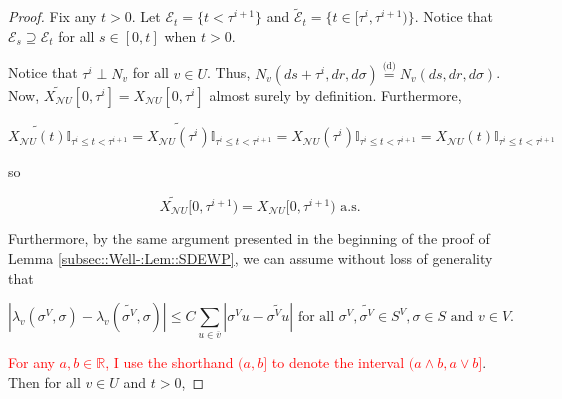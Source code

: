 \documentclass[12pt]{article}
\newcommand{\mb}{\mathbb}
\newcommand{\mc}{\mathcal}
\newcommand{\ov}{\overline}
\newcommand{\te}{\text}
\newcommand{\tr}{\textcolor{red}}
\newcommand{\ind}{\hspace{24pt}}
\newcommand{\deq}{\overset{\text{(d)}}{=}}			%
\newcommand{\neigh}{\mc{N}}					%
\renewcommand{\v}{v}							%
\newcommand{\vv}{u}								%
\renewcommand{\U}{U}							%
\newcommand{\cl}{\ov}							%
\renewcommand{\S}{S}							%
\newcommand{\s}{\sigma}							%
\newcommand{\sv}[1]{\s^{#1}}					%
\renewcommand{\t}{t}							%
\newcommand{\poiss}[1]{N_{#1}}						%
\newcommand{\V}{V}									%
\renewcommand{\tt}{s}								%
\newcommand{\rt}[1]{\tau^{#1}}						%
\newcommand{\itt}{i}								%
\newcommand{\XState}[1]{\S^{#1}}				%
\newcommand{\rxvt}[2]{X_{#1}{(#2)}}					%
\newcommand{\rxvts}[2]{X_{#1}{#2}}					%
\newcommand{\rate}[1]{\lambda_{#1}}					%
\newcommand{\const}[1]{C_{#1}}						%
\newcommand{\alt}{\widetilde}						%
\newcommand{\evnt}{\mc{E}}						%
\begin{document}
\begin{proof}
\ind Fix any \(\t > 0\). Let \(\evnt_\t = \{\t < \rt{\itt+1}\}\) and \(\alt{\evnt}_\t = \{\t\in [\rt{\itt},\rt{\itt+1})\}\). Notice that \(\evnt_\tt \supseteq \evnt_\t\) for all \(\tt\in [0,\t]\) when \(\t > 0\). 

\ind Notice that \(\rt{\itt} \perp \poiss{\v}\) for all \(\v \in \U\). Thus, \(\poiss{\v}(d\tt+\rt{\itt},dr,d\s) \deq \poiss{\v}(d\tt,dr,d\s)\). Now, \(\alt{\rxvts{\neigh{\U}}{}}[0,\rt{\itt}] = \rxvts{\neigh{\U}}{[0,\rt{\itt}]}\) almost surely by definition. Furthermore,

\[\alt{\rxvt{\neigh{\U}}{\t}}\mb{I}_{\rt{\itt}\leq \t < \rt{\itt+1}} = \alt{\rxvt{\neigh{\U}}{\rt{\itt}}}\mb{I}_{\rt{\itt}\leq \t < \rt{\itt+1}} = \rxvt{\neigh{\U}}{\rt{\itt}}\mb{I}_{\rt{\itt}\leq \t < \rt{\itt+1}} = \rxvt{\neigh{\U}}{\t}\mb{I}_{\rt{\itt}\leq \t < \rt{\itt+1}}\]

so

\[\alt{\rxvts{\neigh{\U}}{}}[0,\rt{\itt+1}) = \rxvts{\neigh{\U}}{[0,\rt{\itt+1})} \te{ a.s.}\]

Furthermore, by the same argument presented in the beginning of the proof of Lemma \ref{subsec::Well-:Lem::SDEWP}, we can assume without loss of generality that 

\[|\rate{\v}(\sv{\V}{},\s) - \rate{\v}(\alt{\sv{\V}{}},\s)| \leq \const{}\sum_{\vv\in \cl{\v}} |\sv{\V}{\vv} - \alt{\sv{\V}{\vv}}|\te{ for all } \sv{\V}{},\alt{\sv{\V}{}}\in \S^\V,\s \in \S \te{ and } \v \in \V.\]

\tr{For any \(a,b\in \mb{R}\), I use the shorthand \((a,b]\) to denote the interval \((a\wedge b,a\vee b]\)}. Then for all \(v\in \U\) and \(\t > 0\),


\end{proof}
\end{document}
